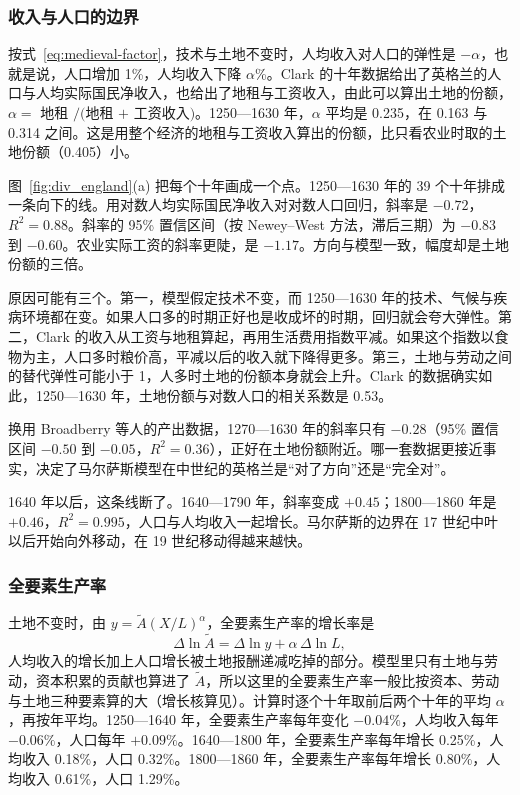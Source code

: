 \subsubsection{收入与人口的边界}
按式~\eqref{eq:medieval-factor}，技术与土地不变时，人均收入对人口的弹性是 $-\alpha$，也就是说，人口增加 1\%，人均收入下降 $\alpha$\%。Clark 的十年数据给出了英格兰的人口与人均实际国民净收入，也给出了地租与工资收入，由此可以算出土地的份额，$\alpha=$ 地租 $/($地租 $+$ 工资收入$)$\cite{clark2010}。1250—1630 年，$\alpha$ 平均是 0.235，在 0.163 与 0.314 之间。这是用整个经济的地租与工资收入算出的份额，比只看农业时取的土地份额（0.405）小。

图~\ref{fig:div_england}(a) 把每个十年画成一个点。1250—1630 年的 39 个十年排成一条向下的线。用对数人均实际国民净收入对对数人口回归，斜率是 $-0.72$，$R^{2}=0.88$。斜率的 95\% 置信区间（按 Newey–West 方法，滞后三期）为 $-0.83$ 到 $-0.60$。农业实际工资的斜率更陡，是 $-1.17$\cite{clark2010}。方向与模型一致，幅度却是土地份额的三倍。

原因可能有三个。第一，模型假定技术不变，而 1250—1630 年的技术、气候与疾病环境都在变。如果人口多的时期正好也是收成坏的时期，回归就会夸大弹性。第二，Clark 的收入从工资与地租算起，再用生活费用指数平减。如果这个指数以食物为主，人口多时粮价高，平减以后的收入就下降得更多。第三，土地与劳动之间的替代弹性可能小于 1，人多时土地的份额本身就会上升。Clark 的数据确实如此，1250—1630 年，土地份额与对数人口的相关系数是 0.53。

换用 Broadberry 等人的产出数据，1270—1630 年的斜率只有 $-0.28$（95\% 置信区间 $-0.50$ 到 $-0.05$，$R^{2}=0.36$），正好在土地份额附近\cite{broadberry2015,boe2017}。哪一套数据更接近事实，决定了马尔萨斯模型在中世纪的英格兰是“对了方向”还是“完全对”。

1640 年以后，这条线断了。1640—1790 年，斜率变成 $+0.45$；1800—1860 年是 $+0.46$，$R^{2}=0.995$，人口与人均收入一起增长\cite{clark2010}。马尔萨斯的边界在 17 世纪中叶以后开始向外移动，在 19 世纪移动得越来越快。

\subsubsection{全要素生产率}
土地不变时，由 $y=\tilde A(X/L)^{\alpha}$，全要素生产率的增长率是
\begin{equation*}
\Delta\ln\tilde A=\Delta\ln y+\alpha\,\Delta\ln L ,
\end{equation*}
人均收入的增长加上人口增长被土地报酬递减吃掉的部分。模型里只有土地与劳动，资本积累的贡献也算进了 $\tilde A$，所以这里的全要素生产率一般比按资本、劳动与土地三种要素算的大（增长核算见）。计算时逐个十年取前后两个十年的平均 $\alpha$，再按年平均。1250—1640 年，全要素生产率每年变化 $-0.04\%$，人均收入每年 $-0.06\%$，人口每年 $+0.09\%$。1640—1800 年，全要素生产率每年增长 0.25\%，人均收入 0.18\%，人口 0.32\%。1800—1860 年，全要素生产率每年增长 0.80\%，人均收入 0.61\%，人口 1.29\%\cite{clark2010}。

